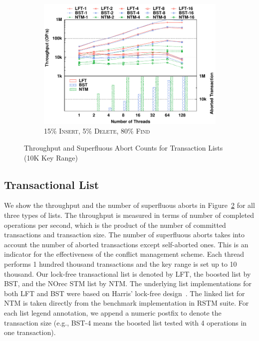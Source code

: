 \documentclass[10pt,conference,compsocconf]{IEEEtran}
\begin{document}
\begin{figure}[t]
\begin{subfigure}{0.325\textwidth}
        \includegraphics[width=1\columnwidth]{./data/amd15ins10kfilled.pdf}
        \vspace{-0.17in}
        \caption{15\% \textsc{Insert}, 5\% \textsc{Delete}, 80\% \textsc{Find}}
        \label{fig:txnlist15}
    \end{subfigure}
    \caption{Throughput and Superfluous Abort Counts for Transaction Lists (10K Key Range)}
    \label{fig:txnlist}
    \vspace{-0.2in}
\end{figure}


\subsection{Transactional List}
\label{sec:txnlistexp}
We show the throughput and the number of superfluous aborts in Figure~\ref{fig:txnlist} for all three types of lists.
The throughput is measured in terms of number of completed operations per second, which is the product of the number of committed transactions and transaction size.
The number of superfluous aborts takes into account the number of aborted transactions except self-aborted ones.
This is an indicator for the effectiveness of the conflict management scheme.
Each thread performs 1 hundred thousand transactions and the key range is set up to 10 thousand.
Our lock-free transactional list is denoted by LFT, the boosted list by BST, and the NOrec STM list by NTM. 
The underlying list implementations for both LFT and BST were based on Harris' lock-free design~\cite{harris2001pragmatic}.
The linked list for NTM is taken directly from the benchmark implementation in RSTM suite.
For each list legend annotation, we append a numeric postfix to denote the transaction size (e.g., BST-4 means the boosted list tested with 4 operations in one transaction). 
\end{document}
